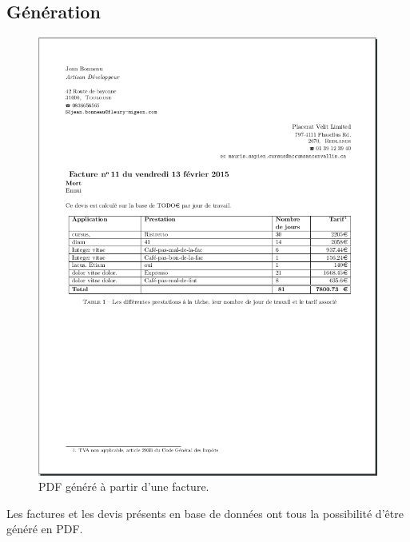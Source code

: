 \subsection{Génération}
\begin{figure}[H]
	\centering
	\includegraphics[width=17cm]{screens/genererPDF.png}
	\caption{PDF généré à partir d'une facture.}
	\label{fig:bill_pdf}
\end{figure}
Les factures et les devis présents en base de données ont tous la possibilité d'être généré en PDF.